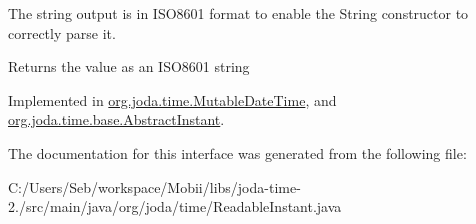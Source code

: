 The string output is in I\-S\-O8601 format to enable the String constructor to correctly parse it.

\begin{DoxyReturn}{Returns}
the value as an I\-S\-O8601 string 
\end{DoxyReturn}


Implemented in \hyperlink{classorg_1_1joda_1_1time_1_1_mutable_date_time_ae2395d77fcd25bf9e9806662cdab446e}{org.\-joda.\-time.\-Mutable\-Date\-Time}, and \hyperlink{classorg_1_1joda_1_1time_1_1base_1_1_abstract_instant_a60362649a83168ced4967c446842da99}{org.\-joda.\-time.\-base.\-Abstract\-Instant}.



The documentation for this interface was generated from the following file\-:\begin{DoxyCompactItemize}
\item 
C\-:/\-Users/\-Seb/workspace/\-Mobii/libs/joda-\/time-\/2./src/main/java/org/joda/time/Readable\-Instant.\-java\end{DoxyCompactItemize}
